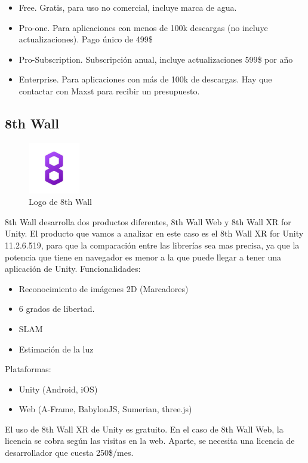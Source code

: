\begin{itemize}
\item Free. Gratis, para uso no comercial, incluye marca de agua.
\item Pro-one. Para aplicaciones con menos de 100k descargas (no incluye actualizaciones). Pago único de 499\$ 
\item Pro-Subscription. Subscripción anual, incluye actualizaciones 599\$ por año
\item Enterprise. Para aplicaciones con más de 100k de descargas. Hay que contactar con Maxst para recibir un presupuesto.
\end{itemize}


\subsection{8th Wall}
\begin{figure}[H]
    \centering
    \includegraphics[width=0.2\textwidth]{Images/8thWall_Logo.jpeg}
    \caption{Logo de 8th Wall}
    \label{fig:8th Wall}
\end{figure}

8th Wall desarrolla dos productos diferentes, 8th Wall Web y 8th Wall XR for Unity. El producto que vamos a analizar en este caso es el 8th Wall XR for Unity 11.2.6.519, para que la comparación entre las librerías sea mas precisa, ya que la potencia que tiene en navegador es menor a la que puede llegar a tener una aplicación de Unity. \cite{8thWall}
Funcionalidades:
\begin{itemize}
\item Reconocimiento de imágenes 2D (Marcadores)
\item 6 grados de libertad.
\item SLAM
\item Estimación de la luz
\end{itemize}

Plataformas:
\begin{itemize}
\item Unity (Android, iOS)
\item Web (A-Frame, BabylonJS, Sumerian, three.js)
\end{itemize}
El uso de 8th Wall XR de Unity es gratuito. En el caso de 8th Wall Web, la licencia se cobra según las visitas en la web. Aparte, se necesita una licencia de desarrollador que cuesta 250\$/mes.\\

